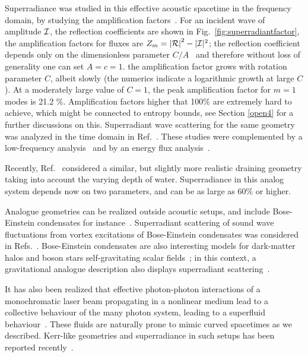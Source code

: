 \documentclass[11pt]{article}
\numberwithin{equation}{section} %
\begin{document}
Superradiance was studied in this effective acoustic spacetime in the frequency domain, by studying the amplification factors~\cite{Berti:2004ju}. 
For an incident wave of amplitude ${\cal I}$, the reflection coefficients are shown in Fig.~\ref{fig:superradiantfactor}, the amplification factors for fluxes are $Z_{m}=\left|{\cal R}\right|^2-|{\cal I}|^2$;
the reflection coefficient depends only on the dimensionless parameter $C/A$~\cite{Berti:2004ju} and therefore without loss of generality one can set $A=c=1$.
the amplification factor grows with rotation parameter $C$, albeit slowly (the numerics indicate a logarithmic growth at large $C$). At a moderately large value of $C=1$,
the peak amplification factor for $m=1$ modes is 21.2 \%. Amplification factors higher that 100\% are extremely hard to achieve, which might be connected to entropy bounds, see Section
\ref{open4} for a further discussions on this.
Superradiant wave scattering for the same geometry was analyzed in the time domain in Ref.~\cite{Cherubini:2005dha}. These studies were complemented by a low-frequency analysis~\cite{Lepe:2004kv} and by an energy flux analysis~\cite{Choy:2005qx}.

Recently, Ref.~\cite{Richartz:2014lda} considered a similar, but slightly more realistic draining geometry taking into account the varying depth of water.
Superradiance in this analog system depends now on two parameters, and can be as large as 60\% or higher.


Analogue geometries can be realized outside acoustic setups, and include Bose-Einstein condensates for instance~\cite{Barcelo:2005fc}.
Superradiant scattering of sound wave fluctuations from vortex excitations of Bose-Einstein condensates
was considered in Refs.~\cite{Federici:2005ty,Ghazanfari:2014fta}. Bose-Einstein condensates are also interesting models for 
dark-matter halos and boson stars self-gravitating scalar fields~\cite{Liebling:2012fv}; in this context, a gravitational analogue description also displays superradiant scattering~\cite{Kuhnel:2014bga}.

It has also been realized that effective photon-photon interactions of a monochromatic laser beam propagating in a nonlinear medium lead to a collective behaviour of the many photon system, leading to a superfluid behaviour~\cite{PhysRevLett.69.1644,Vocke:15}. These fluids are naturally prone to mimic curved spacetimes as we described.
Kerr-like geometries and superradiance in such setups has been reported recently~\cite{PhysRevA.80.065802,Prain:2019jqk}.
\end{document}
